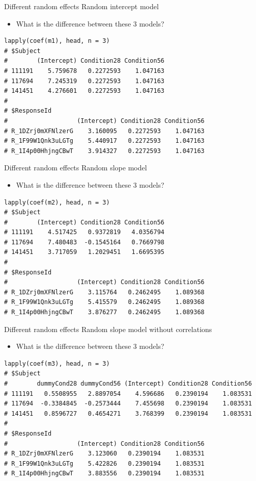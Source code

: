\documentclass[aspectratio=169]{beamer}
\begin{document}
\begin{frame}[fragile]{Different random effects}
  {Random intercept model}
  \begin{itemize}
    \item What is the difference between these 3 models?
  \end{itemize}
\begin{lstlisting}
lapply(coef(m1), head, n = 3)
# $Subject
#        (Intercept) Condition28 Condition56
# 111191    5.759678   0.2272593    1.047163
# 117694    7.245319   0.2272593    1.047163
# 141451    4.276601   0.2272593    1.047163
# 
# $ResponseId
#                   (Intercept) Condition28 Condition56
# R_1DZrj0mXFNlzerG    3.160095   0.2272593    1.047163
# R_1F99W1Qnk3uLGTg    5.440917   0.2272593    1.047163
# R_1I4p00HhjngCBwT    3.914327   0.2272593    1.047163
\end{lstlisting}
\end{frame}

\begin{frame}[fragile]{Different random effects}
  {Random slope model}
  \begin{itemize}
    \item What is the difference between these 3 models?
  \end{itemize}
\begin{lstlisting}
lapply(coef(m2), head, n = 3)
# $Subject
#        (Intercept) Condition28 Condition56
# 111191    4.517425   0.9372819   4.0356794
# 117694    7.480483  -0.1545164   0.7669798
# 141451    3.717059   1.2029451   1.6695395
# 
# $ResponseId
#                   (Intercept) Condition28 Condition56
# R_1DZrj0mXFNlzerG    3.115764   0.2462495    1.089368
# R_1F99W1Qnk3uLGTg    5.415579   0.2462495    1.089368
# R_1I4p00HhjngCBwT    3.876277   0.2462495    1.089368
\end{lstlisting}
\end{frame}

\begin{frame}[fragile]{Different random effects}
  {Random slope model without correlations}
  \begin{itemize}
    \item What is the difference between these 3 models?
  \end{itemize}
\begin{lstlisting}
lapply(coef(m3), head, n = 3)
# $Subject
#        dummyCond28 dummyCond56 (Intercept) Condition28 Condition56
# 111191   0.5508955   2.8897054    4.596686   0.2390194    1.083531
# 117694  -0.3384845  -0.2573444    7.455698   0.2390194    1.083531
# 141451   0.8596727   0.4654271    3.768399   0.2390194    1.083531
# 
# $ResponseId
#                   (Intercept) Condition28 Condition56
# R_1DZrj0mXFNlzerG    3.123060   0.2390194    1.083531
# R_1F99W1Qnk3uLGTg    5.422826   0.2390194    1.083531
# R_1I4p00HhjngCBwT    3.883556   0.2390194    1.083531
\end{lstlisting}
\end{frame}
\end{document}
